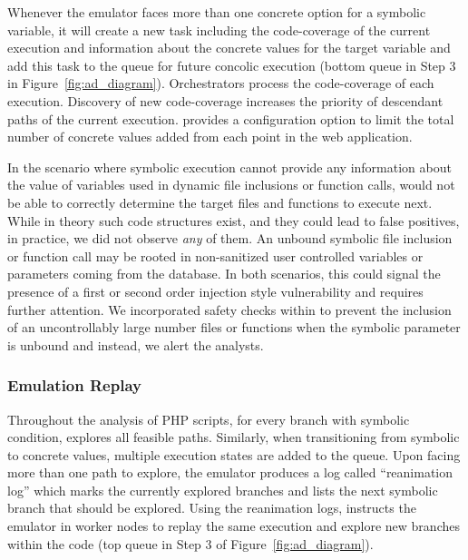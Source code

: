 Whenever the emulator faces more than one concrete option for a symbolic variable, it will create a new task including the code-coverage of the current execution and information about the concrete values for the target variable and add this task to the queue for future concolic execution (bottom queue in Step 3 in Figure~\ref{fig:ad_diagram}). 
Orchestrators process the code-coverage of each execution. 
Discovery of new code-coverage increases the priority of descendant paths of the current execution. 
\animatedead{} provides a configuration option to limit the total number of concrete values added from each point in the web application. 

In the scenario where symbolic execution cannot provide any information about the value of variables used in dynamic file inclusions or function calls, \animatedead{} would not be able to correctly determine the target files and functions to execute next. 
While in theory such code structures exist, and they could lead to false positives, in practice, we did not observe \emph{any} of them. 
An unbound symbolic file inclusion or function call may be rooted in non-sanitized user controlled variables or parameters coming from the database. 
In both scenarios, this could signal the presence of a first or second order injection style vulnerability and requires further attention. 
We incorporated safety checks within \animatedead{} to prevent the inclusion of an uncontrollably large number files or functions when the symbolic parameter is unbound and instead, we alert the analysts. 

\subsubsection{Emulation Replay} 

Throughout the analysis of PHP scripts, for every branch with symbolic condition, \animatedead{} explores all feasible paths. 
Similarly, when transitioning from symbolic to concrete values, multiple execution states are added to the queue. 
Upon facing more than one path to explore, the emulator produces a log called ``reanimation log'' which marks the currently explored branches and lists the next symbolic branch that should be explored. 
Using the reanimation logs, \animatedead{} instructs the emulator in worker nodes to replay the same execution and explore new branches within the code (top queue in Step 3 of Figure~\ref{fig:ad_diagram}). 


